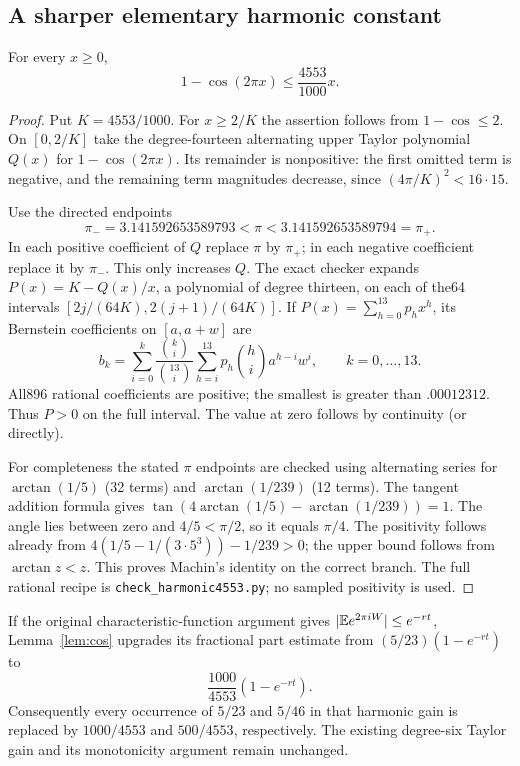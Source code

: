 \subsection{A sharper elementary harmonic constant}
\begin{lemma}\label{lem:cos}
For every $x\ge0$,
\[
               1-\cos(2\pi x)\le\frac{4553}{1000}x.
\]
\end{lemma}
\begin{proof}
Put $K=4553/1000$. For $x\ge2/K$ the assertion follows from
$1-\cos\le2$. On $[0,2/K]$ take the degree-fourteen alternating upper
Taylor polynomial $Q(x)$ for $1-\cos(2\pi x)$. Its remainder is nonpositive:
the first omitted term is negative, and the remaining term magnitudes
decrease, since $(4\pi/K)^2<16\cdot15$.

Use the directed endpoints
\[
 \pi_-=3.141592653589793<\pi<3.141592653589794=\pi_+.
\]
In each positive coefficient of $Q$ replace $\pi$ by $\pi_+$; in each
negative coefficient replace it by $\pi_-$. This only increases $Q$.
The exact checker expands $P(x)=K-Q(x)/x$, a polynomial of degree thirteen,
on each of the64 intervals $[2j/(64K),2(j+1)/(64K)]$. If
$P(x)=\sum_{h=0}^{13}p_hx^h$, its Bernstein coefficients on $[a,a+w]$ are
\[
 b_k=\sum_{i=0}^k\frac{\binom ki}{\binom{13}i}
        \sum_{h=i}^{13}p_h\binom hi a^{h-i}w^i,
               \qquad k=0,\ldots,13.
\]
All896 rational coefficients are positive; the smallest is greater than
$.00012312$. Thus $P>0$ on the full interval. The value at zero follows by
continuity (or directly).

For completeness the stated $\pi$ endpoints are checked using alternating
series for $\arctan(1/5)$ (32 terms) and $\arctan(1/239)$ (12 terms).
The tangent addition formula gives
$\tan(4\arctan(1/5)-\arctan(1/239))=1$.
The angle lies between zero and $4/5<\pi/2$, so it equals $\pi/4$.
The positivity follows already from
$4(1/5-1/(3\cdot5^3))-1/239>0$; the upper bound follows from
$\arctan z<z$. This proves Machin's identity on the correct branch.
The full rational recipe is \texttt{check\_harmonic4553.py}; no sampled
positivity is used.
\end{proof}

If the original characteristic-function argument gives
$|\mathbb E e^{2\pi iW}|\le e^{-rt}$, Lemma~\ref{lem:cos} upgrades its fractional
part estimate from $(5/23)(1-e^{-rt})$ to
\[
                 \frac{1000}{4553}(1-e^{-rt}).
\]
Consequently every occurrence of $5/23$ and $5/46$ in that harmonic gain is
replaced by $1000/4553$ and $500/4553$, respectively. The existing degree-six
Taylor gain and its monotonicity argument remain unchanged.

